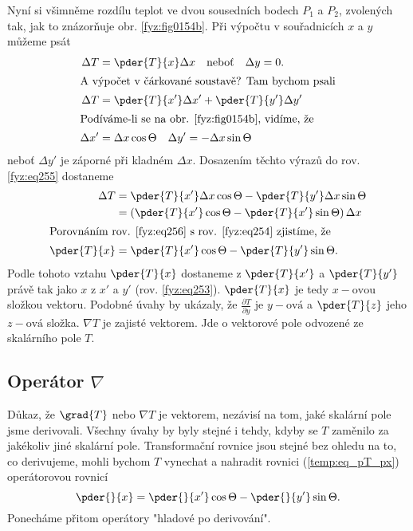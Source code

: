       Nyní si všimněme rozdílu teplot ve dvou sousedních bodech $P_1$ a $P_2$, zvolených tak, jak to
      znázorňuje obr. \ref{fyz:fig0154b}. Při výpočtu v souřadnicích \(x\) a \(y\) můžeme psát
      \begin{align}
        \Delta T  &= \pder{T}{x}\Delta x \quad
                      \text{neboť} \quad \Delta y=0.   \label{fyz:eq254} \\ 
        \shortintertext{A výpočet v čárkované soustavě? Tam bychom psali}
        \Delta T  &= \pder{T}{x'}\Delta x' +
                      \pder{T}{y'}\Delta y'      \label{fyz:eq255}   \\
        \shortintertext{Podíváme-li se na obr. \ref{fyz:fig0154b}, vidíme, že}
        \Delta x' &=  \Delta x\cos\Theta \quad \Delta y' = -\Delta x\sin\Theta
      \end{align}
      neboť $\Delta y'$ je záporné při kladném $\Delta x$. Dosazením těchto výrazů do rov.    
      \ref{fyz:eq255} dostaneme
      \begin{align}
        \Delta T    &=  \pder{T}{x'}\Delta x\cos\Theta
                        -\pder{T}{y'}\Delta x\sin\Theta   \nonumber \\
                    &=  \left(\pder{T}{x'}\cos\Theta   -
                        \pder{T}{x'}\sin\Theta\right)\Delta x  \label{fyz:eq256} \\
        \shortintertext{Porovnáním rov. \ref{fyz:eq256} s rov.   
                        \ref{fyz:eq254} zjistíme, že}
        \pder{T}{x} &=  \pder{T}{x'}\cos\Theta - \pder{T}{y'}\sin\Theta. \label{temp:eq_pT_px}
      \end{align}
      Podle tohoto vztahu $\pder{T}{x}$ dostaneme z $\pder{T}{x'}$ a $\pder{T}{y'}$ právě tak jako 
      \(x\) z $x'$ a $y'$ (rov. \ref{fyz:eq253}). $\pder{T}{x}$ je tedy $x-\text{ovou}$ složkou 
      vektoru. Podobné úvahy by ukázaly, že $\frac{\partial T}{\partial y}$ je $y-\text{ová}$ a 
      $\pder{T}{z}$ jeho $z-\text{ová}$ složka. $\nabla T$ je zajisté vektorem. Jde o vektorové pole 
      odvozené ze skalárního pole $T$.
          
    \subsection{Operátor \texorpdfstring{\fontsize{11pt}{12pt}\selectfont\(\nabla\)}{nabla}}\label{fyz:IIchapIIsecV}
      Důkaz, že $\grad{T}$ nebo $\nabla T$ je vektorem, nezávisí na tom, jaké skalární pole jsme 
      derivovali. Všechny úvahy by byly stejné i tehdy, kdyby se $T$ zaměnilo za jakékoliv jiné 
      skalární pole. Transformační rovnice jsou stejné bez ohledu na to, co derivujeme, mohli bychom 
      $T$ vynechat a nahradit rovnici (\ref{temp:eq_pT_px}) operátorovou rovnicí
      \begin{equation}\label{temp:eq_operatorova_rce}
        \pder{ }{x}=\pder{ }{x'}\cos\Theta - \pder{ }{y'}\sin\Theta.
      \end{equation}
      Ponecháme přitom operátory "hladové po derivování".
  
